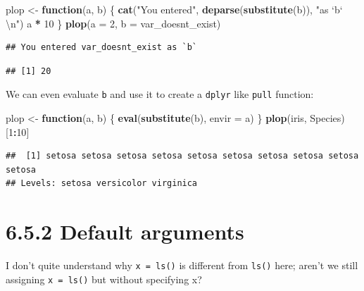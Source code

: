\documentclass[]{book}
\newenvironment{Shaded}{\begin{snugshade}}{\end{snugshade}}
\newcommand{\CharTok}[1]{\textcolor[rgb]{0.31,0.60,0.02}{#1}}
\newcommand{\ControlFlowTok}[1]{\textcolor[rgb]{0.13,0.29,0.53}{\textbf{#1}}}
\newcommand{\DataTypeTok}[1]{\textcolor[rgb]{0.13,0.29,0.53}{#1}}
\newcommand{\DecValTok}[1]{\textcolor[rgb]{0.00,0.00,0.81}{#1}}
\newcommand{\KeywordTok}[1]{\textcolor[rgb]{0.13,0.29,0.53}{\textbf{#1}}}
\newcommand{\NormalTok}[1]{#1}
\newcommand{\OperatorTok}[1]{\textcolor[rgb]{0.81,0.36,0.00}{\textbf{#1}}}
\newcommand{\StringTok}[1]{\textcolor[rgb]{0.31,0.60,0.02}{#1}}
\begin{document}
\begin{Shaded}
\begin{Highlighting}[]
\NormalTok{plop <-}\StringTok{ }\ControlFlowTok{function}\NormalTok{(a, b) \{}
  \KeywordTok{cat}\NormalTok{(}\StringTok{"You entered"}\NormalTok{, }\KeywordTok{deparse}\NormalTok{(}\KeywordTok{substitute}\NormalTok{(b)), }\StringTok{"as `b` }\CharTok{\textbackslash{}n}\StringTok{"}\NormalTok{)}
\NormalTok{  a }\OperatorTok{*}\StringTok{ }\DecValTok{10}
\NormalTok{\}}
\KeywordTok{plop}\NormalTok{(}\DataTypeTok{a =} \DecValTok{2}\NormalTok{, }\DataTypeTok{b =}\NormalTok{ var_doesnt_exist)}
\end{Highlighting}
\end{Shaded}

\begin{verbatim}
## You entered var_doesnt_exist as `b`
\end{verbatim}

\begin{verbatim}
## [1] 20
\end{verbatim}

We can even evaluate \texttt{b} and use it to create a \texttt{dplyr} like \texttt{pull} function:

\begin{Shaded}
\begin{Highlighting}[]
\NormalTok{plop <-}\StringTok{ }\ControlFlowTok{function}\NormalTok{(a, b) \{}
  \KeywordTok{eval}\NormalTok{(}\KeywordTok{substitute}\NormalTok{(b), }\DataTypeTok{envir =}\NormalTok{ a)}
\NormalTok{\}}
\KeywordTok{plop}\NormalTok{(iris, Species)[}\DecValTok{1}\OperatorTok{:}\DecValTok{10}\NormalTok{]}
\end{Highlighting}
\end{Shaded}

\begin{verbatim}
##  [1] setosa setosa setosa setosa setosa setosa setosa setosa setosa setosa
## Levels: setosa versicolor virginica
\end{verbatim}

\hypertarget{default-arguments}{%
\section*{6.5.2 Default arguments}\label{default-arguments}}

I don't quite understand why \texttt{x\ =\ ls()} is different from \texttt{ls()} here; aren't we still assigning \texttt{x\ =\ ls()} but without specifying x?
\end{document}
